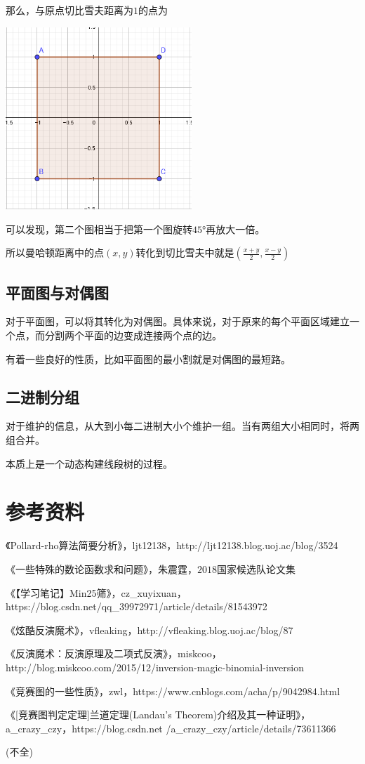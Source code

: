 \documentclass[UTF-8]{ctexart}
\begin{document}
			那么，与原点切比雪夫距离为$1$的点为 
			
			\begin{center}
				\includegraphics[width=7cm]{file//qiebixuefu.png}
			\end{center}
			
			可以发现，第二个图相当于把第一个图旋转$45°$再放大一倍。  
			
			所以曼哈顿距离中的点$(x,y)$转化到切比雪夫中就是$(\frac{x+y}{2},\frac{x-y}{2})$	
		\subsection{平面图与对偶图}
		对于平面图，可以将其转化为对偶图。具体来说，对于原来的每个平面区域建立一个点，而分割两个平面的边变成连接两个点的边。
		
		有着一些良好的性质，比如平面图的最小割就是对偶图的最短路。
		\subsection{二进制分组}
		对于维护的信息，从大到小每二进制大小个维护一组。当有两组大小相同时，将两组合并。
		
		本质上是一个动态构建线段树的过程。
	\newpage
	\section{参考资料}
	《Pollard-rho算法简要分析》，ljt12138，http://ljt12138.blog.uoj.ac/blog/3524
	
	《一些特殊的数论函数求和问题》，朱震霆，$2018$国家候选队论文集
	
	《【学习笔记】Min25筛》，cz\_xuyixuan，https://blog.csdn.net/qq\_39972971/article/details/81543972
	
	《炫酷反演魔术》，vfleaking，http://vfleaking.blog.uoj.ac/blog/87
	
	《反演魔术：反演原理及二项式反演》，miskcoo，http://blog.miskcoo.com/2015/12/inversion-magic-binomial-inversion
	
	《竞赛图的一些性质》，zwl，https://www.cnblogs.com/acha/p/9042984.html
	
	《[竞赛图判定定理]兰道定理(Landau's Theorem)介绍及其一种证明》，a\_crazy\_czy，https://blog.csdn.net /a\_crazy\_czy/article/details/73611366
	
	(不全)
\end{document}
